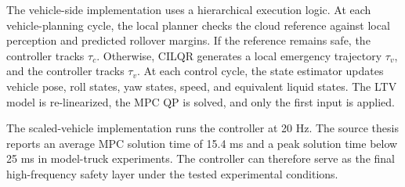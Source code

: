 The vehicle-side implementation uses a hierarchical execution logic. At each vehicle-planning cycle, the local planner checks the cloud reference against local perception and predicted rollover margins. If the reference remains safe, the controller tracks $\tau_c$. Otherwise, CILQR generates a local emergency trajectory $\tau_v$, and the controller tracks $\tau_v$. At each control cycle, the state estimator updates vehicle pose, roll states, yaw states, speed, and equivalent liquid states. The LTV model is re-linearized, the MPC QP is solved, and only the first input is applied.

The scaled-vehicle implementation runs the controller at 20 Hz. The source thesis reports an average MPC solution time of 15.4 ms and a peak solution time below 25 ms in model-truck experiments. The controller can therefore serve as the final high-frequency safety layer under the tested experimental conditions.
